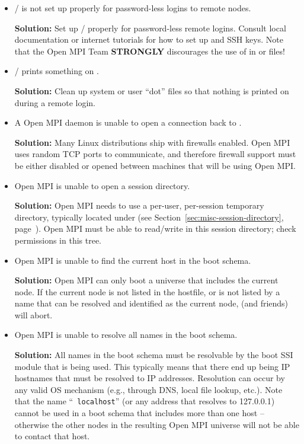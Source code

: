 \begin{itemize}
\item {}/ is not set up properly for password-less
  logins to remote nodes.
  
  {\bf Solution:} Set up / properly for
  password-less remote logins.  Consult local documentation or
  internet tutorials for how to set up  and SSH
  keys.  Note that the Open MPI Team {\bf STRONGLY} discourages the use of
  \cmdarg{+} in  or  files!

\item {}/ prints something on .

  {\bf Solution:} Clean up system or user ``dot'' files so that
  nothing is printed on  during a remote login.

\item A Open MPI daemon is unable to open a connection back to
  .

  {\bf Solution:} Many Linux distributions ship with firewalls
  enabled.  Open MPI uses random TCP ports to communicate, and
  therefore firewall support must be either disabled or opened between
  machines that will be using Open MPI.

\item Open MPI is unable to open a session directory.
  
  {\bf Solution:} Open MPI needs to use a per-user, per-session temporary
  directory, typically located under  (see
  Section~\ref{sec:misc-session-directory},
  page~\pageref{sec:misc-session-directory}).  Open MPI must be able to
  read/write in this session directory; check permissions in this
  tree.

\item Open MPI is unable to find the current host in the boot schema.

  {\bf Solution:} Open MPI can only boot a universe that includes the
  current node.  If the current node is not listed in the hostfile, or
  is not listed by a name that can be resolved and identified as the
  current node,  (and friends) will abort.

\item Open MPI is unable to resolve all names in the boot schema.

  {\bf Solution:} All names in the boot schema must be resolvable by
  the boot SSI module that is being used.  This typically means that
  there end up being IP hostnames that must be resolved to IP
  addresses.  Resolution can occur by any valid OS mechanism (e.g.,
  through DNS, local file lookup, etc.).  Note that the name ``{\tt
  localhost}'' (or any address that resolves to 127.0.0.1) cannot be
  used in a boot schema that includes more than one host -- otherwise
  the other nodes in the resulting Open MPI universe will not be able to
  contact that host.
\end{itemize}

